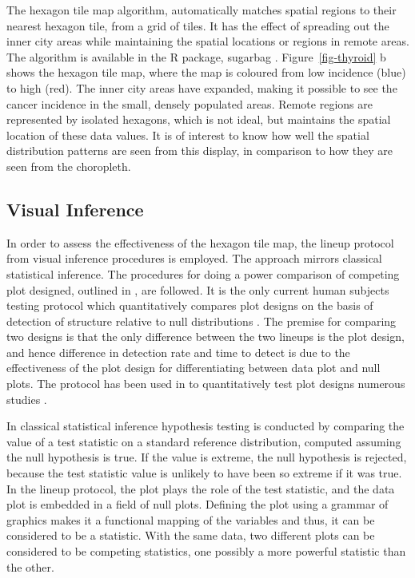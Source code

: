\documentclass[
doublespace,
  times]{anzsauth}
\begin{document}
The hexagon tile map algorithm, automatically matches spatial regions to
their nearest hexagon tile, from a grid of tiles. It has the effect of
spreading out the inner city areas while maintaining the spatial
locations or regions in remote areas. The algorithm is available in the
R package, sugarbag \citep{sugarbag}. Figure~\ref{fig-thyroid} b shows
the hexagon tile map, where the map is coloured from low incidence
(blue) to high (red). The inner city areas have expanded, making it
possible to see the cancer incidence in the small, densely populated
areas. Remote regions are represented by isolated hexagons, which is not
ideal, but maintains the spatial location of these data values. It is of
interest to know how well the spatial distribution patterns are seen
from this display, in comparison to how they are seen from the
choropleth.

\subsection{Visual Inference}\label{visual-inference}

In order to assess the effectiveness of the hexagon tile map, the lineup
protocol \citep{BCHLLSW09, GIIV} from visual inference procedures is
employed. The approach mirrors classical statistical inference. The
procedures for doing a power comparison of competing plot designed,
outlined in \citet{GTPCCD}, are followed. It is the only current human
subjects testing protocol which quantitatively compares plot designs on
the basis of detection of structure relative to null distributions
\citep{VCH, VanderPlas2021Designing}. The premise for comparing two
designs is that the only difference between the two lineups is the plot
design, and hence difference in detection rate and time to detect is due
to the effectiveness of the plot design for differentiating between data
plot and null plots. The protocol has been used in to quantitatively
test plot designs numerous studies
\citep[e.g.][]{LHC, VH2016, KTV, RS2021}.

In classical statistical inference hypothesis testing is conducted by
comparing the value of a test statistic on a standard reference
distribution, computed assuming the null hypothesis is true. If the
value is extreme, the null hypothesis is rejected, because the test
statistic value is unlikely to have been so extreme if it was true. In
the lineup protocol, the plot plays the role of the test statistic, and
the data plot is embedded in a field of null plots. Defining the plot
using a grammar of graphics \citep{ggplot2} makes it a functional
mapping of the variables and thus, it can be considered to be a
statistic. With the same data, two different plots can be considered to
be competing statistics, one possibly a more powerful statistic than the
other.
\end{document}
